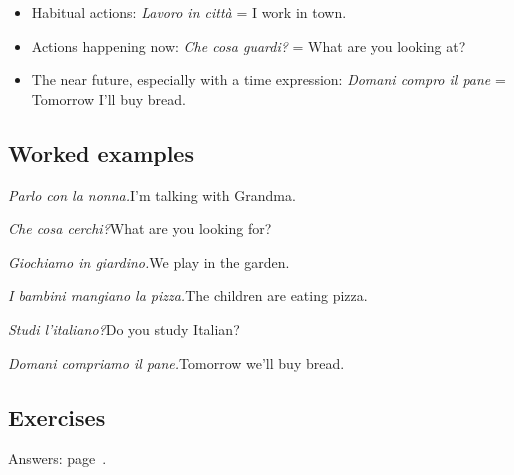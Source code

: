 \documentclass[11pt,a4paper,twoside,openright]{book}
\begin{document}
\begin{itemize}
\item\relax Habitual actions: \textit{Lavoro in città} = I work in town.
\item\relax Actions happening now: \textit{Che cosa guardi?} = What are you looking at?
\item\relax The near future, especially with a time expression: \textit{Domani compro il pane} = Tomorrow I'll buy bread.
\end{itemize}

\subsection*{Worked examples}
\begin{examples}
\item\relax \textit{Parlo con la nonna.}\newline I'm talking with Grandma.
\item\relax \textit{Che cosa cerchi?}\newline What are you looking for?
\item\relax \textit{Giochiamo in giardino.}\newline We play in the garden.
\item\relax \textit{I bambini mangiano la pizza.}\newline The children are eating pizza.
\item\relax \textit{Studi l'italiano?}\newline Do you study Italian?
\item\relax \textit{Domani compriamo il pane.}\newline Tomorrow we'll buy bread.
\end{examples}

\subsection*{Exercises}\label{les:present-are:exercises}
{\color{muted}\small Answers: page~\pageref{ans:present-are}.}
\end{document}
